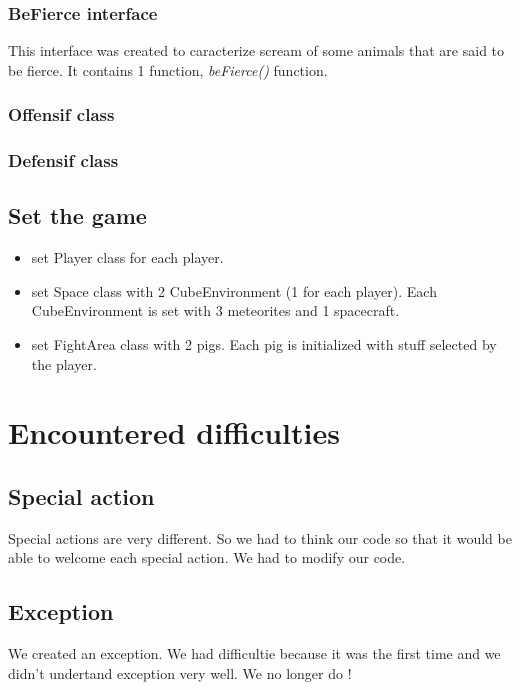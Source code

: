 \subsubsection{BeFierce interface}

This interface was created to caracterize scream of some animals that are said to be fierce.
It contains 1 function, \textit{beFierce()} function.

\subsubsection{Offensif class}

\subsubsection{Defensif class}




\subsection{Set the game}

\begin{itemize}
 \item set Player class for each player.
 \item set Space class with 2 CubeEnvironment (1 for each player). Each CubeEnvironment is set with 3 meteorites and 1 spacecraft.
 \item set FightArea class with 2 pigs. Each pig is initialized with stuff selected by the player.
\end{itemize}


\section{Encountered difficulties}

\subsection{Special action}

Special actions are very different. So we had to think our code so that it would be able to welcome each special action.
We had to modify our code.

\subsection{Exception}

We created an exception. We had difficultie because it was the first time and we didn't undertand exception very well.
We no longer do !


